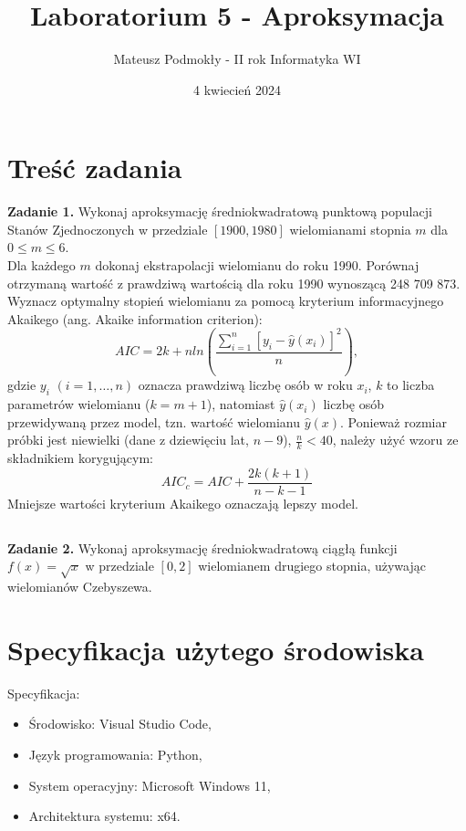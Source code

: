 \documentclass[11pt]{scrartcl}
\title{Laboratorium 5 - Aproksymacja}
\author{Mateusz Podmokły - II rok Informatyka WI}
\date{4 kwiecień 2024}
\begin{document}
    \maketitle
    \section{Treść zadania}
    \textbf{Zadanie 1.} Wykonaj aproksymację średniokwadratową
    punktową populacji Stanów Zjednoczonych w przedziale
    $[1900,1980]$ wielomianami stopnia $m$ dla $0 \leq m \leq 6$. \\
    Dla każdego $m$ dokonaj ekstrapolacji wielomianu do roku 1990.
    Porównaj otrzymaną wartość z prawdziwą wartością dla roku 1990
    wynoszącą 248 709 873. \\
    Wyznacz optymalny stopień wielomianu za pomocą kryterium
    informacyjnego Akaikego (ang. Akaike information criterion):
    \[
        AIC=2k+nln \left( \frac{\sum_{i=1}^{n}[y_i-\hat{y}(x_i)]^2}
        {n} \right),
    \]
    gdzie $y_i$ $(i=1, \ldots ,n)$ oznacza prawdziwą liczbę osób
    w roku $x_i$, $k$ to liczba parametrów wielomianu ($k=m+1$),
    natomiast $\hat{y}(x_i)$ liczbę osób przewidywaną przez model,
    tzn. wartość wielomianu $\hat{y}(x)$. Ponieważ rozmiar próbki
    jest niewielki (dane z dziewięciu lat, $n-9$), $\frac{n}{k}<40$,
    należy użyć wzoru ze składnikiem korygującym:
    \[
        AIC_c=AIC+\frac{2k(k+1)}{n-k-1}
    \]
    Mniejsze wartości kryterium Akaikego oznaczają lepszy model.

    \subsection*{}
    \textbf{Zadanie 2.} Wykonaj aproksymację średniokwadratową ciągłą
    funkcji $f(x)=\sqrt{x}$ w przedziale $[0,2]$ wielomianem drugiego
    stopnia, używając wielomianów Czebyszewa.

    \section{Specyfikacja użytego środowiska}
    Specyfikacja:

    \begin{itemize}
        \item Środowisko: Visual Studio Code,
        \item Język programowania: Python,
        \item System operacyjny: Microsoft Windows 11,
        \item Architektura systemu: x64.
    \end{itemize}
\end{document}
